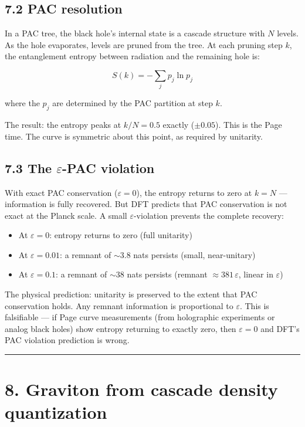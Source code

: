 \documentclass[11pt,a4paper]{article}
\providecommand{\tightlist}{\setlength{\itemsep}{0pt}\setlength{\parskip}{0pt}}
\begin{document}
\subsection*{7.2 PAC resolution}

In a PAC tree, the black hole's internal state is a cascade structure with $N$ levels. As the hole evaporates, levels are pruned from the tree. At each pruning step $k$, the entanglement entropy between radiation and the remaining hole is:

\[S(k) = -\sum_{j} p_j \ln p_j\]

where the $p_j$ are determined by the PAC partition at step $k$.

The result: the entropy peaks at $k/N = 0.5$ exactly ($\pm 0.05$). This is the Page time. The curve is symmetric about this point, as required by unitarity.

\subsection*{7.3 The $\varepsilon$-PAC violation}

With exact PAC conservation ($\varepsilon = 0$), the entropy returns to zero at $k = N$ — information is fully recovered. But DFT predicts that PAC conservation is not exact at the Planck scale. A small $\varepsilon$-violation prevents the complete recovery:

\begin{itemize}\tightlist
\item At $\varepsilon = 0$: entropy returns to zero (full unitarity)
\item At $\varepsilon = 0.01$: a remnant of $\sim 3.8$ nats persists (small, near-unitary)
\item At $\varepsilon = 0.1$: a remnant of $\sim 38$ nats persists (remnant $\approx 381\,\varepsilon$, linear in $\varepsilon$)
\end{itemize}

The physical prediction: unitarity is preserved to the extent that PAC conservation holds. Any remnant information is proportional to $\varepsilon$. This is falsifiable — if Page curve measurements (from holographic experiments or analog black holes) show entropy returning to exactly zero, then $\varepsilon = 0$ and DFT's PAC violation prediction is wrong.

\begin{center}\rule{0.5\linewidth}{0.4pt}\end{center}

\section*{8. Graviton from cascade density quantization}
\end{document}
